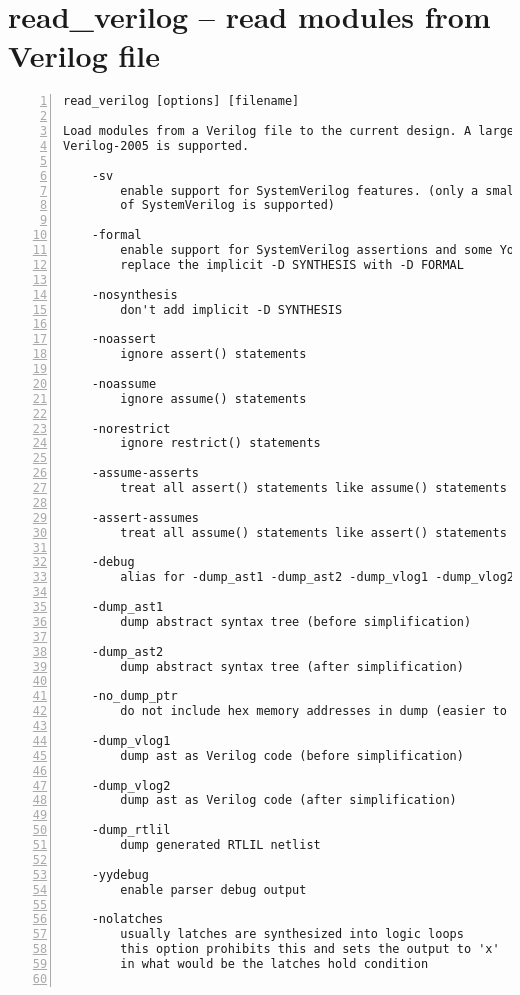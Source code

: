 \section{read\_verilog -- read modules from Verilog file}
\label{cmd:read_verilog}
\begin{lstlisting}[numbers=left,frame=single]
    read_verilog [options] [filename]

Load modules from a Verilog file to the current design. A large subset of
Verilog-2005 is supported.

    -sv
        enable support for SystemVerilog features. (only a small subset
        of SystemVerilog is supported)

    -formal
        enable support for SystemVerilog assertions and some Yosys extensions
        replace the implicit -D SYNTHESIS with -D FORMAL

    -nosynthesis
        don't add implicit -D SYNTHESIS

    -noassert
        ignore assert() statements

    -noassume
        ignore assume() statements

    -norestrict
        ignore restrict() statements

    -assume-asserts
        treat all assert() statements like assume() statements

    -assert-assumes
        treat all assume() statements like assert() statements

    -debug
        alias for -dump_ast1 -dump_ast2 -dump_vlog1 -dump_vlog2 -yydebug

    -dump_ast1
        dump abstract syntax tree (before simplification)

    -dump_ast2
        dump abstract syntax tree (after simplification)

    -no_dump_ptr
        do not include hex memory addresses in dump (easier to diff dumps)

    -dump_vlog1
        dump ast as Verilog code (before simplification)

    -dump_vlog2
        dump ast as Verilog code (after simplification)

    -dump_rtlil
        dump generated RTLIL netlist

    -yydebug
        enable parser debug output

    -nolatches
        usually latches are synthesized into logic loops
        this option prohibits this and sets the output to 'x'
        in what would be the latches hold condition


\end{lstlisting}
